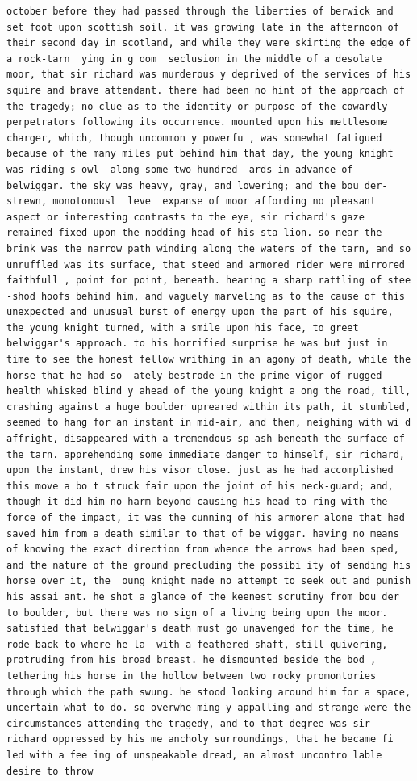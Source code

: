 \documentclass{uva-inf-presentation}
\begin{document}
\begin{frame}[containsverbatim]
\begin{lstlisting}
october before they had passed through the liberties of berwick and set foot upon scottish soil. it was growing late in the afternoon of their second day in scotland, and while they were skirting the edge of a rock-tarn  ying in g oom  seclusion in the middle of a desolate moor, that sir richard was murderous y deprived of the services of his squire and brave attendant. there had been no hint of the approach of the tragedy; no clue as to the identity or purpose of the cowardly perpetrators following its occurrence. mounted upon his mettlesome charger, which, though uncommon y powerfu , was somewhat fatigued because of the many miles put behind him that day, the young knight was riding s owl  along some two hundred  ards in advance of belwiggar. the sky was heavy, gray, and lowering; and the bou der-strewn, monotonousl  leve  expanse of moor affording no pleasant aspect or interesting contrasts to the eye, sir richard's gaze remained fixed upon the nodding head of his sta lion. so near the brink was the narrow path winding along the waters of the tarn, and so unruffled was its surface, that steed and armored rider were mirrored faithfull , point for point, beneath. hearing a sharp rattling of stee -shod hoofs behind him, and vaguely marveling as to the cause of this unexpected and unusual burst of energy upon the part of his squire, the young knight turned, with a smile upon his face, to greet belwiggar's approach. to his horrified surprise he was but just in time to see the honest fellow writhing in an agony of death, while the horse that he had so  ately bestrode in the prime vigor of rugged health whisked blind y ahead of the young knight a ong the road, till, crashing against a huge boulder upreared within its path, it stumbled, seemed to hang for an instant in mid-air, and then, neighing with wi d affright, disappeared with a tremendous sp ash beneath the surface of the tarn. apprehending some immediate danger to himself, sir richard, upon the instant, drew his visor close. just as he had accomplished this move a bo t struck fair upon the joint of his neck-guard; and, though it did him no harm beyond causing his head to ring with the force of the impact, it was the cunning of his armorer alone that had saved him from a death similar to that of be wiggar. having no means of knowing the exact direction from whence the arrows had been sped, and the nature of the ground precluding the possibi ity of sending his horse over it, the  oung knight made no attempt to seek out and punish his assai ant. he shot a glance of the keenest scrutiny from bou der to boulder, but there was no sign of a living being upon the moor. satisfied that belwiggar's death must go unavenged for the time, he rode back to where he la  with a feathered shaft, still quivering, protruding from his broad breast. he dismounted beside the bod , tethering his horse in the hollow between two rocky promontories through which the path swung. he stood looking around him for a space, uncertain what to do. so overwhe ming y appalling and strange were the circumstances attending the tragedy, and to that degree was sir richard oppressed by his me ancholy surroundings, that he became fi led with a fee ing of unspeakable dread, an almost uncontro lable desire to throw 
\end{lstlisting}
\end{frame}
\end{document}
